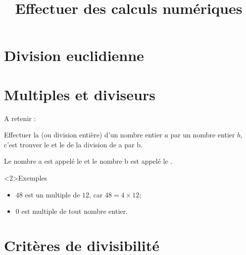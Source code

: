 \documentclass[xcolor={dvipsnames}]{beamer}
\title{Effectuer des calculs numériques}
\author{}\institute{}
\begin{document}
\begin{frame}
  \titlepage 
\end{frame}

\section{Division euclidienne}

\section{Multiples et diviseurs}



\begin{frame}
	
	\begin{alertblock}{A retenir :}

	Effectuer la  (ou division entière) d’un nombre entier $a$ par un nombre entier $b$, c’est trouver le  et le  de la division de a par b.
	
	
	Le nombre a est appelé le  et le nombre b est appelé le .
		
		
	\end{alertblock}
	
	\begin{exampleblock}{Exemples}	
		\begin{itemize}
			\item $48$ est un multiple de $12$, car $48 = 4 \times 12;$
			\item $0$ est multiple de tout nombre entier.
		\end{itemize}
	\end{exampleblock}
	
\end{frame}

\section{Critères de divisibilité}
\end{document}

